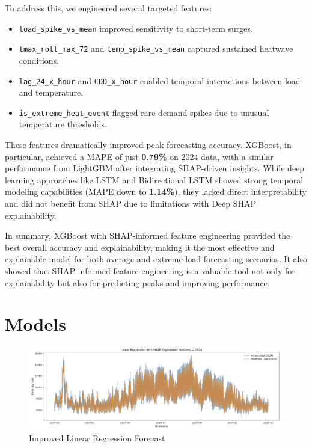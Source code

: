 \documentclass{ifacconf}
\begin{document}
To address this, we engineered several targeted features:
\begin{itemize}
\item \texttt{load_spike_vs_mean} improved sensitivity to short-term surges.
\item \texttt{tmax_roll_max_72} and \texttt{temp_spike_vs_mean} captured sustained heatwave conditions.
\item \texttt{lag_24_x_hour} and \texttt{CDD_x_hour} enabled temporal interactions between load and temperature.
\item \texttt{is_extreme_heat_event} flagged rare demand spikes due to unusual temperature thresholds.
\end{itemize}

These features dramatically improved peak forecasting accuracy. XGBoost, in particular, achieved a MAPE of just \textbf{0.79\%} on 2024 data, with a similar performance from LightGBM after integrating SHAP-driven insights. While deep learning approaches like LSTM and Bidirectional LSTM showed strong temporal modeling capabilities (MAPE down to \textbf{1.14\%}), they lacked direct interpretability and did not benefit from SHAP due to limitations with Deep SHAP explainability.

In summary, XGBoost with SHAP-informed feature engineering provided the best overall accuracy and explainability, making it the most effective and explainable model for both average and extreme load forecasting scenarios. It also showed that SHAP informed feature engineering is a valuable tool not only for explainability but also for predicting peaks and improving performance.
\clearpage
\section{Models}
\begin{figure}[htbp]
    \centering
    \includegraphics[width=1.05\textwidth]{linearImproved.png} 
    \caption{Improved Linear Regression Forecast}
    \label{fig:load_patterns2}
\end{figure}
\end{document}
